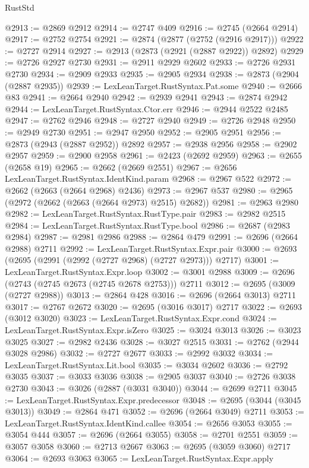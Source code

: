 \begin{lexlean}{RustStd}
\begin{coremodule}
@2913 := @2869 @2912
@2914 := @2747 @409
@2916 := @2745 (@2664 @2914)
@2917 := @2752 @2754
@2921 := @2874 (@2877 (@2752 (@2916 @2917)))
@2922 := @2727 @2914
@2927 := @2913 (@2873 (@2921 (@2887 @2922)) @2892)
@2929 := @2726 @2927 @2730
@2931 := @2911 @2929 @2602
@2933 := @2726 @2931 @2730
@2934 := @2909 @2933
@2935 := @2905 @2934
@2938 := @2873 (@2904 (@2887 @2935))
@2939 := LexLeanTarget.RustSyntax.Pat.some
@2940 := @2666 @83
@2941 := @2664 @2940
@2942 := @2939 @2941
@2943 := @2874 @2942
@2944 := LexLeanTarget.RustSyntax.Ctor.err
@2946 := @2944 @2522 @2485
@2947 := @2762 @2946
@2948 := @2727 @2940
@2949 := @2726 @2948
@2950 := @2949 @2730
@2951 := @2947 @2950
@2952 := @2905 @2951
@2956 := @2873 (@2943 (@2887 @2952)) @2892
@2957 := @2938 @2956
@2958 := @2902 @2957
@2959 := @2900 @2958
@2961 := @2423 (@2692 @2959)
@2963 := @2655 (@2658 @19)
@2965 := @2662 (@2669 @2551)
@2967 := @2656 LexLeanTarget.RustSyntax.IdentKind.param
@2968 := @2967 @522
@2972 := @2662 (@2663 (@2664 @2968) @2436)
@2973 := @2967 @537
@2980 := @2965 (@2972 (@2662 (@2663 (@2664 @2973) @2515) @2682))
@2981 := @2963 @2980
@2982 := LexLeanTarget.RustSyntax.RustType.pair
@2983 := @2982 @2515
@2984 := LexLeanTarget.RustSyntax.RustType.bool
@2986 := @2687 (@2983 @2984)
@2987 := @2981 @2986
@2988 := @2864 @479
@2991 := @2696 (@2664 @2988) @2711
@2992 := LexLeanTarget.RustSyntax.Expr.pair
@3000 := @2693 (@2695 (@2991 (@2992 (@2727 @2968) (@2727 @2973))) @2717)
@3001 := LexLeanTarget.RustSyntax.Expr.loop
@3002 := @3001 @2988
@3009 := @2696 (@2743 (@2745 @2673 (@2745 @2678 @2753))) @2711
@3012 := @2695 (@3009 (@2727 @2988))
@3013 := @2864 @428
@3016 := @2696 (@2664 @3013) @2711
@3017 := @2767 @2672
@3020 := @2695 (@3016 @3017) @2717
@3022 := @2693 (@3012 @3020)
@3023 := LexLeanTarget.RustSyntax.Expr.cond
@3024 := LexLeanTarget.RustSyntax.Expr.isZero
@3025 := @3024 @3013
@3026 := @3023 @3025
@3027 := @2982 @2436
@3028 := @3027 @2515
@3031 := @2762 (@2944 @3028 @2986)
@3032 := @2727 @2677
@3033 := @2992 @3032
@3034 := LexLeanTarget.RustSyntax.Lit.bool
@3035 := @3034 @2602
@3036 := @2792 @3035
@3037 := @3033 @3036
@3038 := @2905 @3037
@3040 := @2726 @3038 @2730
@3043 := @3026 (@2887 (@3031 @3040))
@3044 := @2699 @2711
@3045 := LexLeanTarget.RustSyntax.Expr.predecessor
@3048 := @2695 (@3044 (@3045 @3013))
@3049 := @2864 @471
@3052 := @2696 (@2664 @3049) @2711
@3053 := LexLeanTarget.RustSyntax.IdentKind.callee
@3054 := @2656 @3053
@3055 := @3054 @444
@3057 := @2696 (@2664 @3055)
@3058 := @2701 @2551
@3059 := @3057 @3058
@3060 := @2713 @2667
@3063 := @2695 (@3059 @3060) @2717
@3064 := @2693 @3063
@3065 := LexLeanTarget.RustSyntax.Expr.apply

\end{coremodule}
\end{lexlean}
